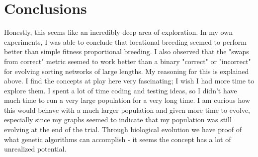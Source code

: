 \documentclass[9pt]{article}
\begin{document}
 
\section{Conclusions}

Honestly, this seems like an incredibly deep area of exploration. In my own experiments, I was able to conclude that locational breeding seemed to perform better than simple fitness proportional breeding. I also observed that the "swaps from correct" metric seemed to work better than a binary "correct" or "incorrect" for evolving sorting networks of large lengths. My reasoning for this is explained above. I find the concepts at play here very fascinating; I wish I had more time to explore them. I spent a lot of time coding and testing ideas, so I didn't have much time to run a very large population for a very long time. I am curious how this would behave with a much larger population and given more time to evolve, especially since my graphs seemed to indicate that my population was still evolving at the end of the trial. Through biological evolution we have proof of what genetic algorithms can accomplish - it seems the concept has a lot of unrealized potential. 
\end{document}
